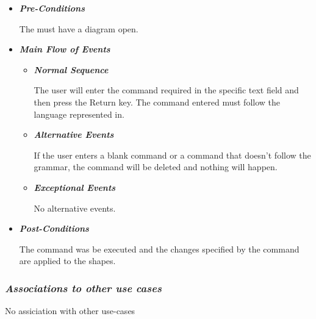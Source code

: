 \begin{itemize}

\item {\bf \em Pre-Conditions}
\par \noindent
The must have a diagram open.
\item {\bf \em Main Flow of Events}

\begin{itemize}

\item {\bf \em Normal Sequence}
\par \noindent
The user will enter the command required in the specific text field and then press the Return key. The command entered must follow the language represented in.

\item {\bf \em Alternative Events}
\par \noindent
If the user enters a blank command or a command that doesn't follow the grammar, the command will be deleted and nothing will happen.

\item {\bf \em Exceptional Events}
\par \noindent
No alternative events.

\end{itemize}

\item {\bf \em Post-Conditions}
\par \noindent
The command was be executed and the changes specified by the command are applied to the shapes.

\end{itemize}

\subsubsection {\em Associations to other use cases}
No assiciation with other use-cases

